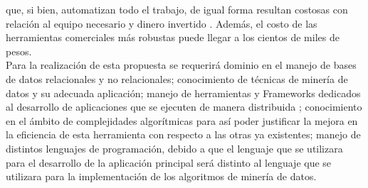 que, si bien, automatizan todo el trabajo, de igual forma resultan costosas con relación al equipo necesario y dinero invertido \cite{refi6}.
Además, el costo de las herramientas comerciales más robustas puede llegar a los cientos de miles de pesos.
\\
Para la realización de esta propuesta se requerirá dominio en el manejo de bases de datos relacionales y no relacionales;
conocimiento de técnicas de minería de datos y su adecuada aplicación; manejo de herramientas y Frameworks dedicados al
desarrollo de aplicaciones que se ejecuten de manera distribuida \cite{refi10}; conocimiento en el ámbito de complejidades algorítmicas
para así poder justificar la mejora en la eficiencia de esta herramienta con respecto a las otras ya existentes; manejo de distintos
lenguajes de programación, debido a que el lenguaje que se utilizara para el desarrollo de la aplicación principal será distinto al
lenguaje que se utilizara para la implementación de los algoritmos de minería de datos.